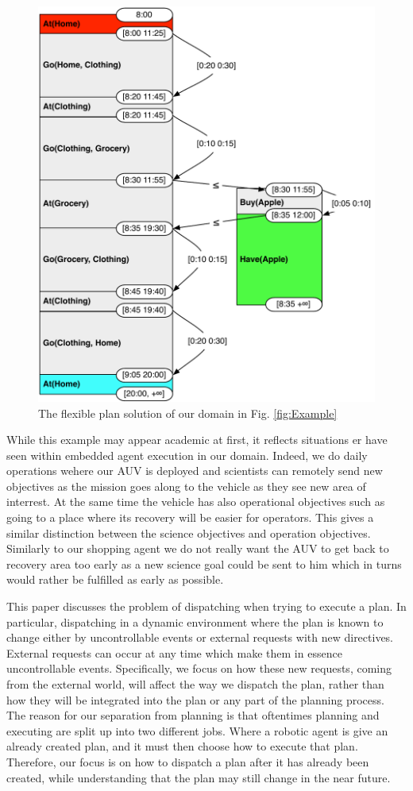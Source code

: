 \begin{figure}
  \centering
  \includegraphics[width=0.8\columnwidth]{figs/example_plan}
  \caption{The flexible plan solution of our domain in
    Fig. \ref{fig:Example}}
  \label{fig:ex:plan}
\end{figure}

While this example may appear academic at first, it reflects situations
er have seen within embedded agent execution in our domain. Indeed, we
do daily operations wehere our AUV is deployed and scientists can
remotely send new objectives as the mission goes along to the vehicle
as they see new area of interrest. At the same time the vehicle has
also operational objectives such as going to a place where its
recovery will be easier for operators. This gives a similar
distinction between the science objectives and operation
objectives. Similarly to our shopping agent we do not really want the
AUV to get back to recovery area too early as a new science goal could
be sent to him which in turns would rather be fulfilled as early as
possible.

This paper discusses the problem of dispatching when trying to execute
a plan. In particular, dispatching in a dynamic environment where the
plan is known to change either by uncontrollable events or external
requests with new directives. External requests  can occur
at any time which make them in essence uncontrollable events.
Specifically, we focus on how these new requests, coming from the
external world, will affect the way we dispatch the plan, rather than
how they will be integrated into the plan or any part of the planning
process.  The reason for our separation from planning is that
oftentimes planning and executing are split up into two different
jobs. Where a robotic agent is give an already created plan, and it
must then choose how to execute that plan. Therefore, our focus is on
how to dispatch a plan after it has already been created, while
understanding that the plan may still change in the near future.

